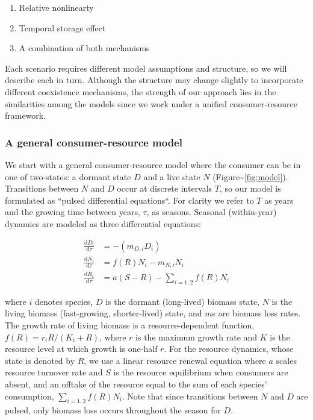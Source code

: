 \documentclass[12pt,]{article}
\begin{document}
\begin{enumerate}
  \item Relative nonlinearty
  \item Temporal storage effect
  \item A combination of both mechanisms
\end{enumerate}

Each scenario requires different model assumptions and structure, so we
will describe each in turn. Although the structure may change slightly
to incorporate different coexistence mechanisms, the strength of our
approach lies in the similarities among the models since we work under a
unified consumer-resource framework.

\subsubsection{A general consumer-resource
model}\label{a-general-consumer-resource-model}

We start with a general consumer-resource model where the consumer can
be in one of two-states: a dormant state $D$ and a live state $N$
(Figure\textasciitilde{}\ref{fig:model}). Transitions between $N$ and
$D$ occur at discrete intervals $T$, so our model is formulated as
``pulsed differential equations``. For clarity we refer to $T$ as years
and the growing time between years, $\tau$, as seasons. Seasonal
(within-year) dynamics are modeled as three differential equations:

\begin{align}
\frac{\text{d}D_{i}}{\text{d}\tau} &= -(m_{D,i}D_{i})\\
\frac{\text{d}N_{i}}{\text{d}\tau} &= f(R)N_{i} - m_{N,i}N_{i}\\
\frac{\text{d}R_{i}}{\text{d}\tau} &= a(S - R) - \sum\limits_{i=1,2}f(R)N_{i}
\end{align}

where $i$ denotes species, $D$ is the dormant (long-lived) biomass
state, $N$ is the living biomass (fast-growing, shorter-lived) state,
and $m$s are biomass loss rates. The growth rate of living biomass is a
resource-dependent function, $f(R) = r_{i}R/(K_{i}+R)$, where $r$ is the
maximum growth rate and $K$ is the resource level at which growth is
one-half $r$. For the resource dynamics, whose state is denoted by $R$,
we use a linear resource renewal equation where $a$ scales resource
turnover rate and $S$ is the resource equilibrium when consumers are
absent, and an offtake of the resource equal to the sum of each species'
consumption, $\sum_{i=1,2}f(R)N_{i}$. Note that since transitions
between $N$ and $D$ are pulsed, only biomass loss occurs throughout the
season for $D$.
\end{document}
